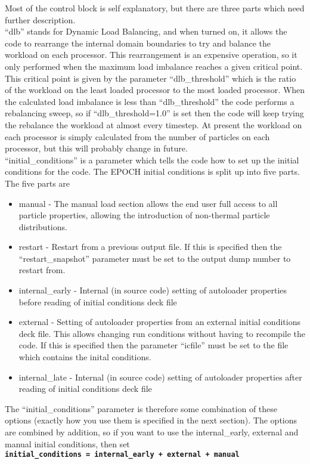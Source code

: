 \documentclass[12pt]{article}
\newcommand{\inlinecode}[1]{{\color{warwickred} \bf\texttt{#1}}}
\newcommand{\nEPOCH}{{\color{warwickdark}\fontfamily{phv}\selectfont EPOCH}}
\newcommand{\EPOCH}{{\nEPOCH} }
\begin{document}
Most of the control block is self explanatory, but there are three parts which
need further description. \\
``dlb'' stands for Dynamic Load Balancing, and when turned on, it allows the
code to rearrange the internal domain boundaries to try and balance the
workload on each processor. This rearrangement is an expensive operation, so
it only performed when the maximum load imbalance reaches a given critical
point. This critical point is given by the parameter ``dlb\_threshold'' which
is the ratio of the workload on the least loaded processor to the most loaded
processor. When the calculated load imbalance is less than ``dlb\_threshold''
the code performs a rebalancing sweep, so if ``dlb\_threshold=1.0'' is set
then the code will keep trying the rebalance the workload at almost every
timestep. At present the workload on each processor is simply calculated from
the number of particles on each processor, but this will probably change in
future.\\
``initial\_conditions'' is a parameter which tells the code how to set up the
initial conditions for the code. The \EPOCH initial conditions is split up
into five parts. The five parts are
\begin{itemize}
\item manual - The manual load section allows the end user full access to all
  particle properties, allowing the introduction of non-thermal particle
  distributions.
\item restart - Restart from a previous output file. If this is specified then
  the ``restart\_snapshot'' parameter must be set to the output dump number to
  restart from.
\item internal\_early - Internal (in source code) setting of autoloader
  properties before reading of initial conditions deck file
\item external - Setting of autoloader properties from an external initial
  conditions deck file. This allows changing run conditions without having to
  recompile the code. If this is specified then the parameter ``icfile'' must
  be set to the file which contains the inital conditions.
\item internal\_late - Internal (in source code) setting of autoloader
  properties after reading of initial conditions deck file
\end{itemize}
The ``initial\_conditions'' parameter is therefore some combination of these
options (exactly how you use them is specified in the next section). The
options are combined by addition, so if you want to use the internal\_early,
external and manual initial conditions, then set\\
\inlinecode{initial\_conditions = internal\_early + external + manual}\\
\end{document}
